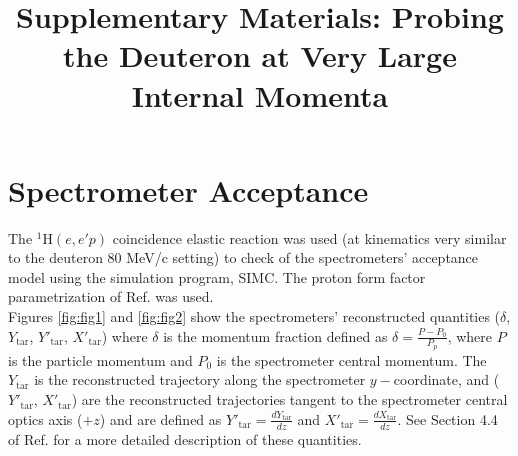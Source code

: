 \documentclass[aps, prl]{revtex4-2}  %
\begin{document}
\title{Supplementary Materials: Probing the Deuteron at Very Large Internal Momenta}
\maketitle
\section{\large Spectrometer Acceptance}
\noindent The $^{1}$H$(e,e'p)$ coincidence elastic reaction was used (at kinematics very similar to the deuteron 80 MeV/c setting) to check of the spectrometers'
acceptance model\cite{COSY} using the simulation program, SIMC. The proton form factor parametrization of Ref.\cite{PhysRevC.69.022201} was used. \\
\indent Figures \ref{fig:fig1} and \ref{fig:fig2} show the spectrometers' reconstructed quantities ($\delta$,  $Y_{\mathrm{tar}}$, $Y'_{\mathrm{tar}}$, $X'_{\mathrm{tar}}$)
where $\delta$ is the momentum fraction defined as $\delta = \frac{P-P_{0}}{P_{p}}$, where $P$ is the particle momentum and $P_{0}$ is the spectrometer central momentum.
The $Y_{\mathrm{tar}}$ is the reconstructed trajectory along the spectrometer $y-$coordinate, and ($Y'_{\mathrm{tar}}$, $X'_{\mathrm{tar}}$) are the reconstructed trajectories
tangent to the spectrometer central optics axis ($+z$) and are defined as $Y'_{\mathrm{tar}} = \frac{dY_{\mathrm{tar}}}{dz}$ and $X'_{\mathrm{tar}} = \frac{dX_{\mathrm{tar}}}{dz}$.
See Section 4.4 of Ref.\cite{cyero_phdthesis} for a more detailed description of these quantities.\\
\end{document}
